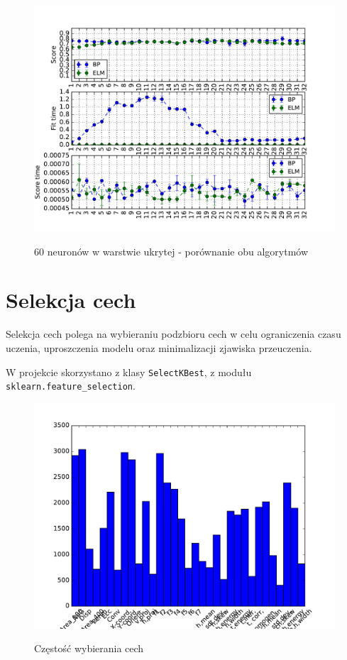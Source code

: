 \begin{figure}[h!]
	\centering
	\includegraphics[width=\linewidth]{img/bp_elm_60.pdf}
	\label{Rysunek}
	\caption{60 neuronów w warstwie ukrytej - porównanie obu algorytmów}
\end{figure}

\section{Selekcja cech}
Selekcja cech polega na wybieraniu podzbioru cech w celu ograniczenia czasu uczenia, uproszczenia modelu oraz minimalizacji zjawiska przeuczenia.

W projekcie skorzystano z klasy \texttt{SelectKBest}, z modułu \texttt{sklearn.feature\_selection}.
\begin{figure}[h!]
	\centering
	\includegraphics[width=\linewidth]{img/features.pdf}
	\label{Rysunek}
	\caption{Częstość wybierania cech}
\end{figure}

